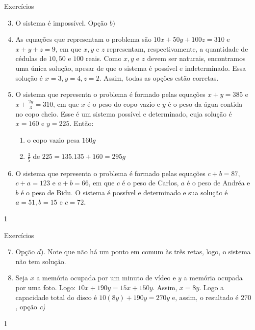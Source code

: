 \def\currentcolor{cor1}
\clearmargin
\begin{answer}{Exercícios}
{\exerciselist
\begin{enumerate}\setcounter{enumi}{2}
\item O sistema é impossível. Opção $b)$
\item As equações que representam o problema são $10x + 50y + 100z = 310$ e $x + y + z = 9$, em que $x, y$ e $z$ representam, respectivamente, a quantidade de cédulas de $10, 50$ e $100$ reais. Como $x, y$ e $z$ devem ser naturais, encontramos uma única solução, apesar de que o sistema é possível e indeterminado. Essa solução é $x=3, y=4, z=2$. Assim, todas as opções estão corretas.
\item O sistema que representa o problema é formado pelas equações $x + y = 385$ e $x + \frac{2y}{3} = 310$, em que $x$ é o peso do copo vazio e $y$ é o peso da água contida no copo cheio. Esse é um sistema possível e determinado, cuja solução é $x=160$ e $y=225$. Então:
\begin{enumerate}
\item o copo vazio pesa $160g$
\item $\frac{3}{5}$ de $225 = 135. 135 + 160 = 295g$
\end{enumerate}

\item O sistema que representa o problema é formado pelas equações $c+b=87$, $c+a=123$ e $a+b=66$, em que $c$ é o peso de Carlos, $a$ é o peso de Andréa e $b$ é o peso de Bidu. O sistema é possível e determinado e sua solução é $a=51, b=15$ e $c=72.$
\end{enumerate}
}{1}
\end{answer}
\clearmargin

\begin{answer}{Exercícios}
{\exerciselist
\begin{enumerate}\setcounter{enumi}{6}
\item Opção $d)$. Note que não há um ponto em comum às três retas, logo, o sistema não tem solução.
\item Seja $x$ a memória ocupada por um minuto de vídeo e $y$ a memória ocupada por uma foto. Logo:
$10x + 190y = 15x + 150y$. Assim, $x = 8y$.
Logo a capacidade total do disco é $10(8y) + 190y = 270y$ e, assim, o resultado é $270$, opção \textit{c)} 
\end{enumerate}
}{1}
\end{answer}
\clearmargin

